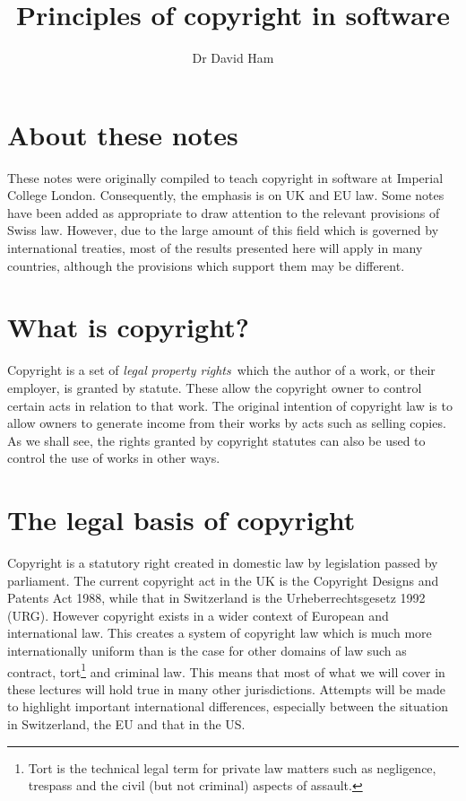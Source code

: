 \documentclass[a4paper,12pt]{article}
\begin{document}
\title{Principles of copyright in software}

\author{Dr David Ham}

\renewcommand{\today}{24 May 2013}

\maketitle

\section{About these notes}

These notes were originally compiled to teach copyright in software at
Imperial College London. Consequently, the emphasis is on UK and EU
law. Some notes have been added as appropriate to draw attention to the
relevant provisions of Swiss law. However, due to the large amount of this field
which is governed by international treaties, most of the results presented
here will apply in many countries, although the provisions which support
them may be different.

\section{What is copyright?}

Copyright is a set of \emph{legal property rights}\ which the author of a work, or
their employer, is granted by statute. These allow the copyright owner to
control certain acts in relation to that work. The original intention of copyright
law is to allow owners to generate income from their works by acts such as
selling copies. As we shall see, the rights granted by copyright statutes
can also be used to control the use of works in other ways.

\section{The legal basis of copyright}

Copyright is a statutory right created in domestic law by legislation passed
by parliament. The current copyright act in the UK is the Copyright Designs
and Patents Act 1988, while that in Switzerland is the Urheberrechtsgesetz
1992 (URG). However copyright exists in a wider context of European and
international law. This creates a system of copyright law which is much more
internationally uniform than is the case for other domains of law such as
contract, tort\footnote{Tort is the technical legal term for private law
  matters such as negligence, trespass and the civil (but not criminal)
  aspects of assault.} and criminal law. This means that most of what we
will cover in these lectures will hold true in many other
jurisdictions. Attempts will be made to highlight important international
differences, especially between the situation in Switzerland, the EU and
that in the US.
\end{document}
